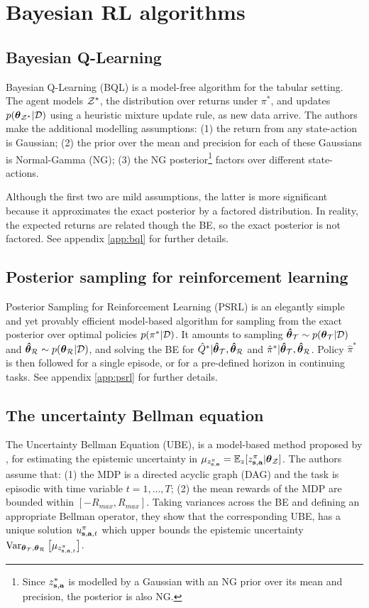 \documentclass{article}
\begin{document}
\section{Bayesian RL algorithms}
\subsection{Bayesian Q-Learning}
Bayesian Q-Learning (BQL) \citep{bqlearning} is a model-free algorithm for the tabular setting. The agent models $\mathcal{Z}^*$, the distribution over returns under $\pi^*$, and updates $p(\boldsymbol{\theta}_{\mathcal{Z}^*} | \mathcal{D})$ using a heuristic mixture update rule, as new data arrive. The authors make the additional modelling assumptions: (1) the return from any state-action is Gaussian; (2) the prior over the mean and precision for each of these Gaussians is Normal-Gamma (NG); (3) the NG posterior\footnote{Since $z^*_{\mathbf{s}, \mathbf{a}}$ is modelled by a Gaussian with an NG prior over its mean and precision, the posterior is also NG.} factors over different state-actions.

Although the first two are mild assumptions, the latter is more significant because it approximates the exact posterior by a factored distribution. In reality, the expected returns are related though the BE, so the exact posterior is not factored. See appendix \ref{app:bql} for further details.

\subsection{Posterior sampling for reinforcement learning}

Posterior Sampling for Reinforcement Learning (PSRL) \citep{psrl} is an elegantly simple and yet provably efficient model-based algorithm for sampling from the exact posterior over optimal policies $p(\pi^* | \mathcal{D})$. It amounts to sampling $\boldsymbol{\hat{\theta}}_{\mathcal{T}} \sim p(\boldsymbol{\theta}_{\mathcal{T}} | \mathcal{D})$ and $\boldsymbol{\hat{\theta}}_{\mathcal{R}} \sim p(\boldsymbol{\theta}_{\mathcal{R}} | \mathcal{D})$, and solving the BE for $\hat{Q}^* | \boldsymbol{\hat{\theta}}_{\mathcal{T}}, \boldsymbol{\hat{\theta}}_{\mathcal{R}} $ and $\hat{\pi}^* | \boldsymbol{\hat{\theta}}_{\mathcal{T}}, \boldsymbol{\hat{\theta}}_{\mathcal{R}}$. Policy $\hat{\pi}^*$ is then followed for a single episode, or for a pre-defined horizon in continuing tasks. See appendix \ref{app:psrl} for further details.

\subsection{The uncertainty Bellman equation}
The Uncertainty Bellman Equation (UBE), is a model-based method proposed by \cite{ube}, for estimating the epistemic uncertainty in $\mu_{z^\pi_{\mathbf{s}, \mathbf{a}}} = \operatorname{\mathbb{E}}_z [z^\pi_{\mathbf{s}, \mathbf{a}} | \boldsymbol{\theta}_{\mathcal{Z}}]$. The authors assume that: (1) the MDP is a directed acyclic graph (DAG) and the task is episodic with time variable $t = 1, ..., T$; (2) the mean rewards of the MDP are bounded within $[-R_{max}, R_{max}]$. Taking variances across the BE and defining an appropriate Bellman operator, they show that the corresponding UBE, has a unique solution $u_{\mathbf{s}, \mathbf{a}, t}^\pi$ which upper bounds the epistemic uncertainty $\operatorname{\text{Var}}_{\boldsymbol{\theta}_{\mathcal{T}}, \boldsymbol{\theta}_{\mathcal{R}}} \big[ \mu_{z^{\pi}_{\mathbf{s}, \mathbf{a}, t}} \big]$.
\end{document}
